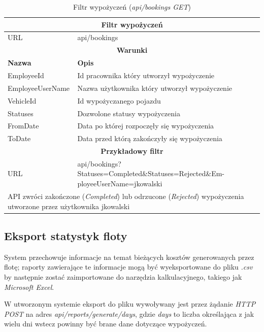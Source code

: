 \documentclass[eng,printmode,openany]{mgr}
\begin{document}
\begin{table}[H]
	\caption{Filtr wypożyczeń (\textit{api/bookings GET})}
	\begin{tabularx}{\textwidth}{|l|X|}
		\hline                                       							
		\multicolumn{2}{|c|}{\textbf{Filtr wypożyczeń}}							        		\\ \hline
		URL                 & api/bookings     							             			\\ \hline
		\multicolumn{2}{|c|}{\textbf{Warunki}}     												\\ \hline
		\textbf{Nazwa}      & \textbf{Opis}              										\\ \hline
		EmployeeId        	& Id pracownika który utworzył wypożyczenie 						\\ \hline
		EmployeeUserName	& Nazwa użytkownika który utworzył wypożyczenie						\\ \hline	
		VehicleId	        & Id wypożyczanego pojazdu       									\\ \hline
		Statuses        	& Dozwolone statusy wypożyczenia         							\\ \hline
		FromDate       		& Data po której rozpoczęły się wypożyczenia						\\ \hline
		ToDate 			    & Data przed którą zakończyły się wypożyczenia						\\ \hline											
		\multicolumn{2}{|c|}{\textbf{Przykładowy filtr}}										\\ \hline
		URL                 & api/bookings?Statuses=Completed\&Statuses=Rejected\&Em-ployeeUserName=jkowalski \\ \hline
		\multicolumn{2}{|X|}{API zwróci zakończone (\textit{Completed}) lub odrzucone (\textit{Rejected}) wypożyczenia utworzone przez użytkownika jkowalski}	\\ \hline
	\end{tabularx}
\end{table}

\newpage
\subsection{Eksport statystyk floty}
System przechowuje informacje na temat bieżących kosztów generowanych przez flotę; raporty zawierające te informacje mogą być wyeksportowane do pliku \textit{.csv} by następnie zostać zaimportowane do narzędzia kalkulacyjnego, takiego jak \textit{Microsoft Excel}.

W utworzonym systemie eksport do pliku wywoływany jest przez żądanie \textit{HTTP POST} na adres \textit{api/reports/generate/days}, gdzie \textit{days} to liczba określająca z jak wielu dni wstecz powinny być brane dane dotyczące wypożyczeń.
\end{document}

